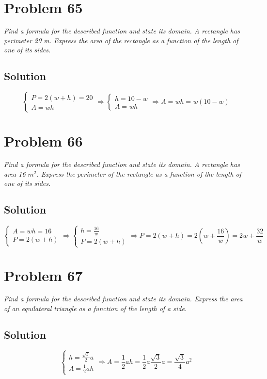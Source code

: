 \documentclass[11pt]{article}
\newcommand{\soln}{\subsection*}
\newcommand{\qn}{\textit}
\begin{document}
\section*{Problem 65}

\qn{Find a formula for the described function and state its domain. A rectangle has perimeter 20 m. Express the area of the rectangle as a function of the length of one of its sides.}

\soln{Solution}
\begin{equation*}
	\begin{cases}
		P = 2(w+h) = 20 \\
		A = wh
	\end{cases}
	\Rightarrow
	\begin{cases}
		h = 10-w \\
		A = wh
	\end{cases}
	\Rightarrow
	A = wh = w(10-w)
\end{equation*}

\section*{Problem 66}

\qn{Find a formula for the described function and state its domain. A rectangle has area 16 $m^2$. Express the perimeter of the rectangle as a function of the length of one of its sides.}

\soln{Solution}
\begin{equation*}
	\begin{cases}
		A = wh = 16 \\
		P = 2(w+h)
	\end{cases}
	\Rightarrow
	\begin{cases}
		h = \frac{16}{w}\\
		P = 2(w+h)
	\end{cases}
	\Rightarrow
	P = 2(w+h) = 2(w+\frac{16}{w}) = 2w+\frac{32}{w}
\end{equation*}

\section*{Problem 67}

\qn{Find a formula for the described function and state its domain. Express the area of an equilateral triangle as a function of the length of a side.}

\soln{Solution}
\begin{equation*}
	\begin{cases}
		h = \frac{\sqrt{3}}{2}a \\
		A = \frac{1}{2}ah
	\end{cases}
	\Rightarrow
	A = \frac{1}{2}ah = \frac{1}{2}a\frac{\sqrt{3}}{2}a = \frac{\sqrt{3}}{4}a^2
\end{equation*}
\end{document}
